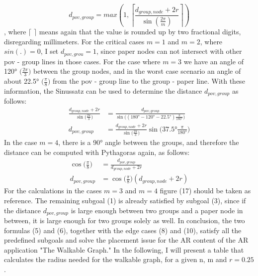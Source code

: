 \documentclass[12pt,a4paper,oneside,american,parskip=half]{article}
\begin{document}
\begin{justify}
\begin{normalsize}
\begin{equation}
d_{pov, group} = max \left(1, \left\lceil \frac{d_{group, node} + 2r}{\sin(\frac{2\pi}{m})} \right\rceil \right)
\end{equation}
, where $\lceil$  $\rceil$ means again that the value is rounded up by two fractional digits, disregarding millimeters.
\newline
For the critical cases $m = 1$ and $m = 2$, where $sin(.) = 0$, I set $d_{pov, grou} = 1$, since paper nodes can not intersect with other pov - group lines in those cases.
For the case where $m = 3$ we have an angle of 120° $\big(\frac{2\pi}{3}\big)$ between the group nodes, and in the worst case scenario an angle of about 22.5° $\big(\frac{\pi}{8}\big)$ from the pov - group line to the group - paper line. With these information, the Sinussatz can be used to determine the distance $d_{pov, group}$ as follows:
\begin{align}
\frac{d_{group, node} + 2r}{\sin\big(\frac{2\pi}{3}\big)} &= \frac{d_{pov, group}}{\sin\big((180° - 120° - 22.5°) \frac{\pi}{180°}\big)} \\
d_{pov, group} &= \frac{d_{group, node} + 2r}{\sin\big(\frac{2\pi}{3}\big)} \sin\big(37.5° \frac{\pi}{180°}\big)
\end{align}
In the case $m = 4$, there is a 90° angle between the groups, and therefore the distance can be computed with Pythagoras again, as follows:
\begin{align}
\cos\big(\frac{\pi}{8}\big) &= \frac{d_{pov, group}}{d_{group, node} + 2r} \\
d_{pov, group} &= \cos\big(\frac{\pi}{8}\big) (d_{group, node} + 2r)
\end{align}
\newline
For the calculations in the cases $m = 3$ and $m = 4$ figure (17) should be taken as reference.
The remaining subgoal (1) is already satisfied by subgoal (3), since if the distance $d_{pov, group}$ is large enough between two groups and a paper node in between, it is large enough for two groups solely as well.
\newline
In conclusion, the two formulas (5) and (6), together with the edge cases (8) and (10), satisfy all the predefined subgoals and solve the placement issue for the AR content of the AR application "The Walkable Graph." In the following, I will present a table that calculates the radius needed for the walkable graph, for a given n, m and $r = 0.25$. 


\end{normalsize}
\end{justify}
\end{document}
